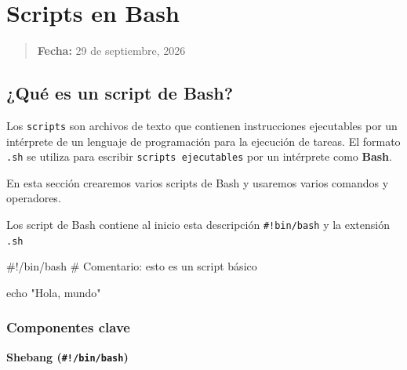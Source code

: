 \documentclass[
  spanish,
  12pt,
  letterpaper,
  DIV=11,
  numbers=noendperiod]{scrreprt}
\newenvironment{Shaded}{\begin{snugshade}}{\end{snugshade}}
\newcommand{\BuiltInTok}[1]{\textcolor[rgb]{0.00,0.23,0.31}{#1}}
\newcommand{\CommentTok}[1]{\textcolor[rgb]{0.37,0.37,0.37}{#1}}
\newcommand{\StringTok}[1]{\textcolor[rgb]{0.13,0.47,0.30}{#1}}
\begin{document}
\chapter{Scripts en Bash}\label{scripts-en-bash}

\begin{quote}
\textbf{Fecha:} 29 de septiembre, 2026
\end{quote}

\section{¿Qué es un script de Bash?}\label{quuxe9-es-un-script-de-bash}

Los \texttt{scripts} son archivos de texto que contienen instrucciones
ejecutables por un intérprete de un lenguaje de programación para la
ejecución de tareas. El formato \texttt{.sh} se utiliza para escribir
\texttt{scripts\ ejecutables} por un intérprete como \textbf{Bash}.

En esta sección crearemos varios scripts de Bash y usaremos varios
comandos y operadores.

\begin{tcolorbox}[enhanced jigsaw, arc=.35mm, bottomrule=.15mm, bottomtitle=1mm, breakable, colback=white, colbacktitle=quarto-callout-note-color!10!white, colframe=quarto-callout-note-color-frame, coltitle=black, left=2mm, leftrule=.75mm, opacityback=0, opacitybacktitle=0.6, rightrule=.15mm, title={Estructura básica de un script}, titlerule=0mm, toprule=.15mm, toptitle=1mm]

Los script de Bash contiene al inicio esta descripción
\texttt{\#!bin/bash} y la extensión \texttt{.sh}

\begin{Shaded}
\begin{Highlighting}[]
\CommentTok{\#!/bin/bash}
\CommentTok{\# Comentario: esto es un script básico}

\BuiltInTok{echo} \StringTok{"Hola, mundo"}
\end{Highlighting}
\end{Shaded}

\end{tcolorbox}

\subsection{Componentes clave}\label{componentes-clave}

\textbf{Shebang (\texttt{\#!/bin/bash})}
\end{document}
